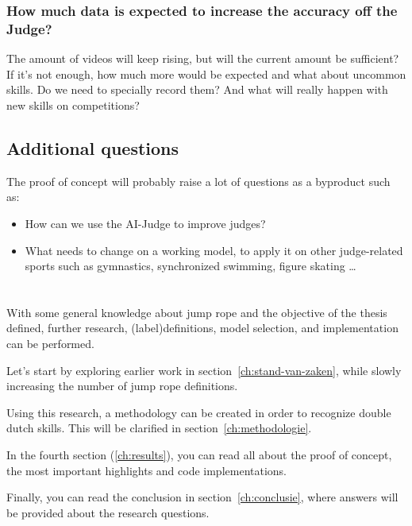 \subsubsection{How much data is expected to increase the accuracy off the Judge?}
\label{subsubsec:intro-question-expected-data-to-increase-accuracy}

The amount of videos will keep rising, but will the current amount be sufficient? If it's not enough, how much more would be expected and what about uncommon skills. Do we need to specially record them? And what will really happen with new skills on competitions?

\subsection{Additional questions}
\label{subsubsec:intro-question-additional}

The proof of concept will probably raise a lot of questions as a byproduct such as:

\begin{itemize}
    \item How can we use the AI-Judge to improve judges?
    \item What needs to change on a working model, to apply it on other judge-related sports such as gymnastics, synchronized swimming, figure skating \dots
\end{itemize}


\section{}%
\label{sec:opzet-bachelorproef}


With some general knowledge about jump rope and the objective of the thesis defined, further research, (label)definitions, model selection, and implementation can be performed.

Let’s start by exploring earlier work in section~\ref{ch:stand-van-zaken}, while slowly increasing the number of jump rope definitions.

Using this research, a methodology can be created in order to recognize double dutch skills. This will be clarified in section~\ref{ch:methodologie}.

In the fourth section (\ref{ch:results}), you can read all about the proof of concept, the most important highlights and code implementations.

Finally, you can read the conclusion in section~\ref{ch:conclusie}, where answers will be provided about the research questions.

